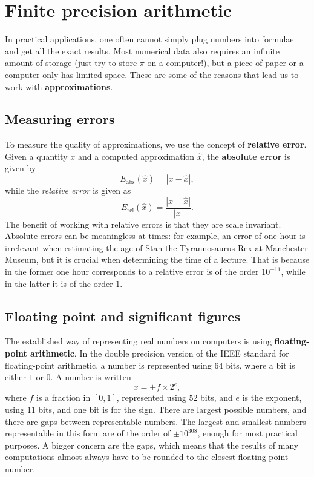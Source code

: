 \section{Finite precision arithmetic}
In practical applications, one often cannot simply plug numbers into formulae and get all the exact results. Most numerical data also requires an infinite 
amount of storage (just try to store $\pi$ on a computer!), but a piece of paper or a computer only has limited space. These are some of the reasons that lead us to work with \textbf{approximations}.

\subsection{Measuring errors}
To measure the quality of approximations, we use the concept of \textbf{relative error}. Given a quantity $x$ and a computed approximation $\hat{x}$, the \textbf{absolute error} is given by
\begin{equation*}
  E_{\mathrm{abs}}(\hat{x}) = |x-\hat{x}|,
\end{equation*}
while the {\em relative error} is given as
\begin{equation*}
 E_{\mathrm{rel}}(\hat{x}) = \frac{|x-\hat{x}|}{|x|}.
\end{equation*}
The benefit of working with relative errors is that they are scale invariant. Absolute errors can be meaningless at times: for example, an error of one hour is irrelevant when estimating the age of Stan the Tyrannosaurus Rex at Manchester Museum, but it is crucial when determining the time of a lecture. That is because in the former one hour corresponds to a relative error is of the order $10^{-11}$, while in 
the latter it is of the order $1$.

\subsection{Floating point and significant figures}
The established way of representing real numbers on computers is using \textbf{floating-point arithmetic}. In the double precision version of the IEEE standard
for floating-point arithmetic, a number is represented using $64$ bits, where a bit is either $1$ or $0$. A number is written
\begin{equation*}
  x = \pm f \times 2^e,
\end{equation*}
where $f$ is a fraction in $[0,1]$, represented using $52$ bits, and $e$ is the exponent, using $11$ bits, and one bit is for the sign. 
There are largest possible numbers, and there are gaps between representable numbers. The largest
and smallest numbers representable in this form are of the order of $\pm 10^{308}$, enough for most practical purposes. A bigger concern are the gaps, which 
means that the results of many computations almost always have to be rounded to the closest floating-point number. 

